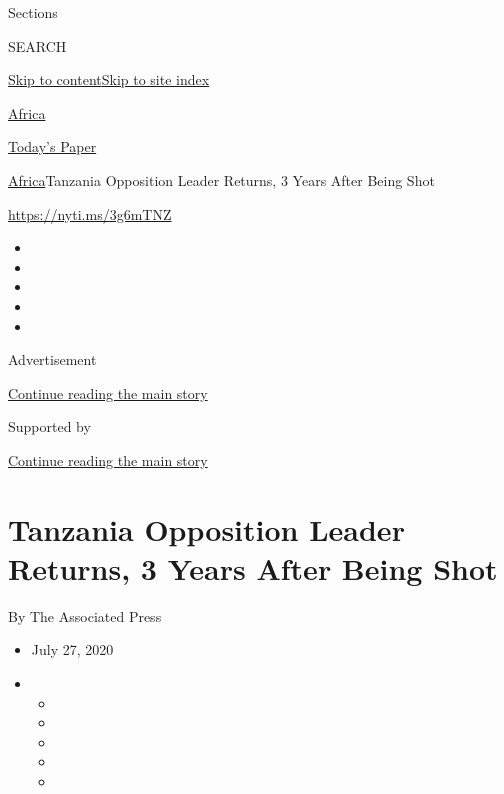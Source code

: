 Sections

SEARCH

\protect\hyperlink{site-content}{Skip to
content}\protect\hyperlink{site-index}{Skip to site index}

\href{https://www.nytimes3xbfgragh.onion/section/world/africa}{Africa}

\href{https://myaccount.nytimes3xbfgragh.onion/auth/login?response_type=cookie\&client_id=vi}{}

\href{https://www.nytimes3xbfgragh.onion/section/todayspaper}{Today's
Paper}

\href{/section/world/africa}{Africa}\textbar{}Tanzania Opposition Leader
Returns, 3 Years After Being Shot

\url{https://nyti.ms/3g6mTNZ}

\begin{itemize}
\item
\item
\item
\item
\item
\end{itemize}

Advertisement

\protect\hyperlink{after-top}{Continue reading the main story}

Supported by

\protect\hyperlink{after-sponsor}{Continue reading the main story}

\hypertarget{tanzania-opposition-leader-returns-3-years-after-being-shot}{%
\section{Tanzania Opposition Leader Returns, 3 Years After Being
Shot}\label{tanzania-opposition-leader-returns-3-years-after-being-shot}}

By The Associated Press

\begin{itemize}
\item
  July 27, 2020
\item
  \begin{itemize}
  \item
  \item
  \item
  \item
  \item
  \end{itemize}
\end{itemize}

